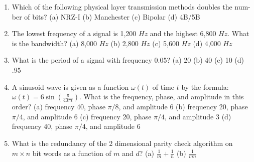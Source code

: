 \documentclass{article}
\begin{document}
    \begin{enumerate}
        \item Which of the following physical layer transmission methods doubles the num-ber of bits?
            \newline
            (a) NRZ-I
            \newline
            (b) Manchester
            \newline
            (c) Bipolar
            \newline
            (d) 4B/5B
        \item The lowest frequency of a signal is 1,200 $Hz$ and the highest 6,800 $Hz$. What is the bandwidth?
            \newline
            (a) 8,000 $Hz$
            \newline
            (b) 2,800 $Hz$
            \newline
            (c) 5,600 $Hz$
            \newline
            (d) 4,000 $Hz$
        \item What is the period of a signal with frequency 0.05?
            \newline
            (a) 20
            \newline
            (b) 40
            \newline
            (c) 10
            \newline
            (d) .95
        \item A sinusoid wave is given as a function $\omega(t)$ of time $t$ by the formula: $\omega(t) = 6\sin(\frac{\pi}{40\pi t})$. What is the frequency, phase, and amplitude in this order?
            \newline
            (a) frequency 40, phase $\pi/8$, and amplitude 6
            \newline
            (b) frequency 20, phase $\pi/4$, and amplitude 6
            \newline
            (c) frequency 20, phase $\pi/4$, and amplitude 3
            \newline
            (d) frequency 40, phase $\pi/4$, and amplitude 6
        \item What is the redundancy of the 2 dimensional parity check algorithm on $m \times n$ bit words as a function of $m$ and $d$?
            \newline
            (a) $\frac{1}{m} + \frac{1}{n}$
            \newline
            (b) $\frac{1}{mn}$
            \newline

\end{enumerate}
\end{document}
